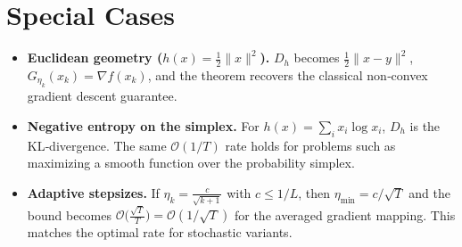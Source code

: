 \documentclass{article}
\newcommand{\grad}{\nabla}
\newcommand{\Dh}{D_h}
\begin{document}
\section*{Special Cases}
\begin{itemize}
\item \textbf{Euclidean geometry ($h(x)=\tfrac12\|x\|^{2}$).}  $\Dh$ becomes $\tfrac12\|x-y\|^{2}$, $G_{\eta_k}(x_k)=\grad f(x_k)$, and the theorem recovers the classical non‑convex gradient descent guarantee.

\item \textbf{Negative entropy on the simplex.}  For $h(x)=\sum_{i}x_i\log x_i$, $\Dh$ is the KL‑divergence. The same $\mathcal{O}(1/T)$ rate holds for problems such as maximizing a smooth function over the probability simplex.

\item \textbf{Adaptive stepsizes.}  If $\eta_k= \frac{c}{\sqrt{k+1}}$ with $c\le 1/L$, then $\eta_{\min}=c/\sqrt{T}$ and the bound becomes $\mathcal{O}\bigl(\frac{\sqrt{T}}{T}\bigr)=\mathcal{O}(1/\sqrt{T})$ for the averaged gradient mapping. This matches the optimal rate for stochastic variants.
\end{itemize}
\end{document}
